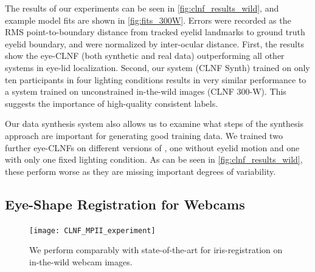 The results of our experiments can be seen in \autoref{fig:clnf_results_wild}, and example model fits are shown in \autoref{fig:fits_300W}.
Errors were recorded as the RMS point-to-boundary distance from tracked eyelid landmarks to ground truth eyelid boundary, and were normalized by inter-ocular distance. 
First, the results show the eye-CLNF (both synthetic and real data) outperforming all other systems in eye-lid localization. 
Second, our system (CLNF Synth) trained on only ten participants in four lighting conditions results in very similar performance to a system trained on unconstrained in-the-wild images (CLNF 300-W). This suggests the importance of high-quality consistent labels.

Our data synthesis system also allows us to examine what steps of the synthesis approach are important for generating good training data. We trained two further eye-CLNFs on different versions of \dataset, one without eyelid motion and one with only one fixed lighting condition. As can be seen in \autoref{fig:clnf_results_wild}, these perform worse as they are missing important degrees of variability.

\subsection{Eye-Shape Registration for Webcams}




\begin{figure}
    \centering
    \texttt{[image: CLNF\_MPII\_experiment]}
    \caption{We perform comparably with state-of-the-art for iris-registration on in-the-wild webcam images.}
    \label{fig:clnf_results_MPII}
\end{figure}


